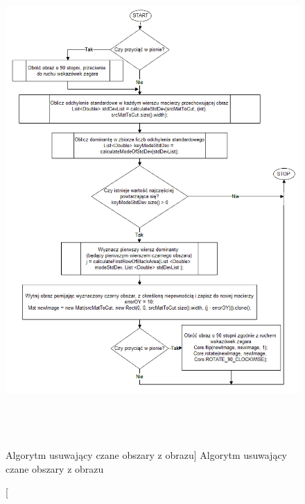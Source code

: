 \documentclass[a4paper,12pt]{article}
\begin{document}
    			\begin{figure}[!ht]  
    			    \begin{center}
    				    \includegraphics[height=18cm] {image//algorithm//cutBlackArea.png} 
    			    \end{center}
    			    \caption
        			[Algorytm usuwający czane obszary z obrazu]  
    	    		{Algorytm usuwający czane obszary z obrazu}  
    	    		\label{fig:cutBlack}
    		    \end{figure}
		    
		        \newpage
		    
\end{document}
